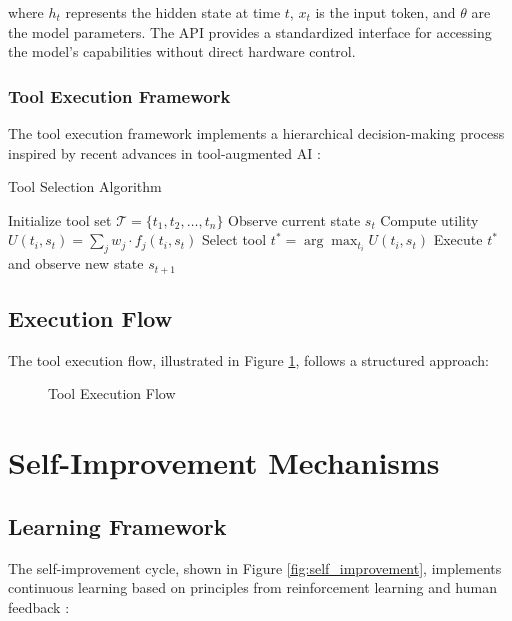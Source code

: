 \documentclass[11pt,a4paper]{article}
\begin{document}
where $h_t$ represents the hidden state at time $t$, $x_t$ is the input token, and $\theta$ are the model parameters. The API provides a standardized interface for accessing the model's capabilities without direct hardware control.

\subsubsection{Tool Execution Framework}

The tool execution framework implements a hierarchical decision-making process inspired by recent advances in tool-augmented AI \cite{zhang2023codegeex}:

\begin{algorithm}[H]
\caption{Tool Selection Algorithm}
\begin{algorithmic}[1]
\STATE Initialize tool set $\mathcal{T} = \{t_1, t_2, \ldots, t_n\}$
\STATE Observe current state $s_t$
    \STATE Compute utility $U(t_i, s_t) = \sum_{j} w_j \cdot f_j(t_i, s_t)$
\ENDFOR
\STATE Select tool $t^* = \arg\max_{t_i} U(t_i, s_t)$
\STATE Execute $t^*$ and observe new state $s_{t+1}$
\end{algorithmic}
\end{algorithm}

\subsection{Execution Flow}

The tool execution flow, illustrated in Figure \ref{fig:execution_flow}, follows a structured approach:

\begin{figure}[H]
\centering

\caption{Tool Execution Flow}
\label{fig:execution_flow}
\end{figure}

\section{Self-Improvement Mechanisms}

\subsection{Learning Framework}

The self-improvement cycle, shown in Figure \ref{fig:self_improvement}, implements continuous learning based on principles from reinforcement learning \cite{sutton2018reinforcement} and human feedback \cite{christiano2017deep}:
\end{document}
